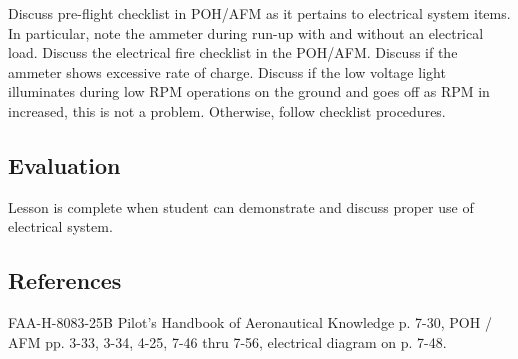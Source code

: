 Discuss pre-flight checklist in POH/AFM as it pertains to electrical system
items. In particular, note the ammeter during run-up with and without an
electrical load. Discuss the electrical fire checklist in the POH/AFM. Discuss
if the ammeter shows excessive rate of charge. Discuss if the low voltage light
illuminates during low RPM operations on the ground and goes off as RPM in
increased, this is not a problem. Otherwise, follow checklist procedures.

\subsection{Evaluation}

Lesson is complete when student can demonstrate and discuss proper use of
electrical system.

\subsection{References}

FAA-H-8083-25B Pilot's Handbook of Aeronautical Knowledge p. 7-30, POH / AFM
pp.  3-33, 3-34, 4-25, 7-46 thru 7-56, electrical diagram on p. 7-48.
